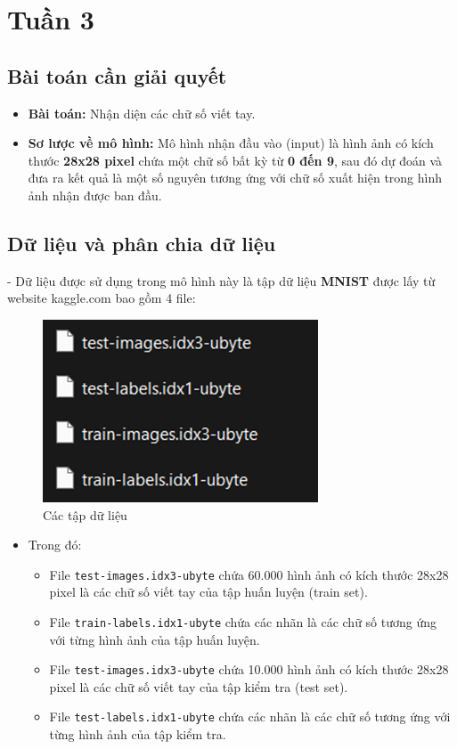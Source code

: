 \newpage
\section{Tuần 3}
\subsection{Bài toán cần giải quyết}
\begin{itemize}
    \item \textbf{Bài toán:} Nhận diện các chữ số viết tay.
    \item \textbf{Sơ lược về mô hình:} \cite{model} Mô hình nhận đầu vào (input) là hình ảnh có kích thước \textbf{28x28 pixel} chứa một chữ số bất kỳ từ \textbf{0 đến 9}, sau đó dự đoán và đưa ra kết quả là một số nguyên tương ứng với chữ số xuất hiện trong hình ảnh nhận được ban đầu.
\end{itemize}

\subsection{Dữ liệu và phân chia dữ liệu}
- Dữ liệu được sử dụng trong mô hình này là tập dữ liệu \textbf{MNIST} \cite{mnist} được lấy từ website kaggle.com bao gồm 4 file:
\begin{figure}[H]
    \centering
    \includegraphics[width=0.5\linewidth]{img/dataset.png}
    \caption{Các tập dữ liệu}
\end{figure}
\begin{itemize}
    \item Trong đó:
    \begin{itemize}
    \item File \texttt{test-images.idx3-ubyte} chứa 60.000 hình ảnh có kích thước 28x28 pixel là các chữ số viết tay của tập huấn luyện (train set).
    \item File \texttt{train-labels.idx1-ubyte} chứa các nhãn là các chữ số tương ứng với từng hình ảnh của tập huấn luyện.
    \item File \texttt{test-images.idx3-ubyte} chứa 10.000 hình ảnh có kích thước 28x28 pixel là các chữ số viết tay của tập kiểm tra (test set).
    \item File \texttt{test-labels.idx1-ubyte} chứa các nhãn là các chữ số tương ứng với từng hình ảnh của tập kiểm tra.
\end{itemize}
\end{itemize}

